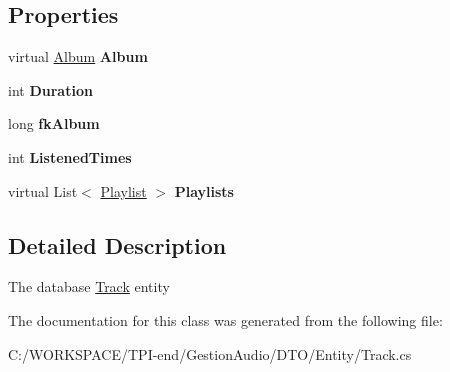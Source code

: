 \subsection*{Properties}
\begin{DoxyCompactItemize}
\item 
\mbox{\label{class_d_t_o_1_1_entity_1_1_track_a8798ee8fe10a9f530a6bfe9f009c9bf4}} 
virtual \hyperlink{class_d_t_o_1_1_entity_1_1_album}{Album} {\bfseries Album}
\item 
\mbox{\label{class_d_t_o_1_1_entity_1_1_track_a23c46b08fc20d064666238ac7b677878}} 
int {\bfseries Duration}
\item 
\mbox{\label{class_d_t_o_1_1_entity_1_1_track_a4972041acdc42377b1550e029d50da10}} 
long {\bfseries fk\+Album}
\item 
\mbox{\label{class_d_t_o_1_1_entity_1_1_track_a22ac890cc5e17003daba71051a39e33b}} 
int {\bfseries Listened\+Times}
\item 
\mbox{\label{class_d_t_o_1_1_entity_1_1_track_a14587bea688f9cd330b9857315a5c5cf}} 
virtual List$<$ \hyperlink{class_d_t_o_1_1_entity_1_1_playlist}{Playlist} $>$ {\bfseries Playlists}
\end{DoxyCompactItemize}


\subsection{Detailed Description}
The database \hyperlink{class_d_t_o_1_1_entity_1_1_track}{Track} entity 



The documentation for this class was generated from the following file\+:\begin{DoxyCompactItemize}
\item 
C\+:/\+W\+O\+R\+K\+S\+P\+A\+C\+E/\+T\+P\+I-\/end/\+Gestion\+Audio/\+D\+T\+O/\+Entity/Track.\+cs\end{DoxyCompactItemize}
